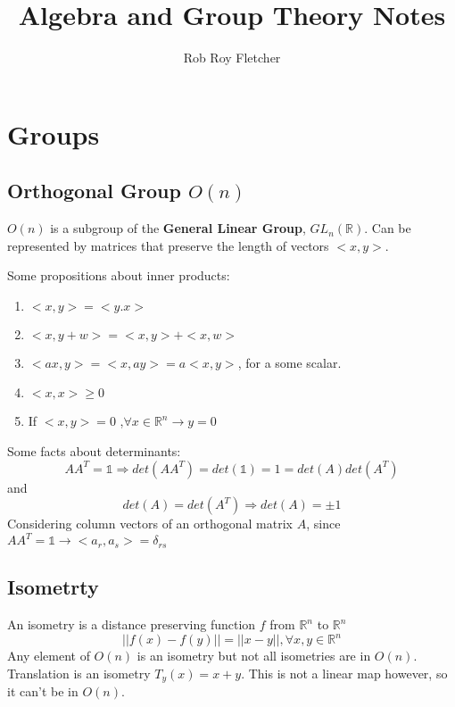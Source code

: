 \documentclass{article}
\title{Algebra and Group Theory Notes}
\author{Rob Roy Fletcher}
\numberwithin{equation}{section}
\begin{document}
\section{Groups}
\subsection{Orthogonal Group $O(n)$}
$O(n)$ is a subgroup of the \textbf{General Linear Group}, $GL_{n}(\mathbb{R})$. Can be represented by matrices that preserve the length of vectors $<x,y>$.


Some propositions about inner products:
\begin{enumerate}
\item
    $<x,y>=<y.x>$
\item
    $<x,y+w>=<x,y>+<x,w>$
\item
    $<ax,y>=<x,ay>=a<x,y>$, for a some scalar.
\item
    $<x,x>\geq 0$
\item
    If $<x,y>=0$ ,$\forall x \in \mathbb{R}^{n} \rightarrow y=0$
\end{enumerate}


Some facts about determinants:
\begin{equation}
    AA^{T}=\mathbb{1}\Rightarrow det(AA^{T})=det(\mathbb{1})=1 = det(A)det(A^{T})
\end{equation}
and
\begin{equation}
    det(A)=det(A^{T})\Rightarrow det(A) = \pm 1
\end{equation}
Considering column vectors of an orthogonal matrix $A$, since $AA^{T}=\mathbb{1}
\rightarrow <a_r, a_s>=\delta_{rs}$

\subsection{Isometrty}
An isometry is a distance preserving function $f$ from $\mathbb{R}^n$ to $\mathbb{R}^n$
\begin{equation}
    ||f(x) - f(y)||=||x-y||, \forall x,y\in \mathbb{R}^n
\end{equation}
Any element of $O(n)$ is an isometry but not all isometries are in $O(n)$. Translation is an isometry $T_y(x)=x+y$. This is not a linear map however, so it can't be in $O(n)$.
\end{document}
